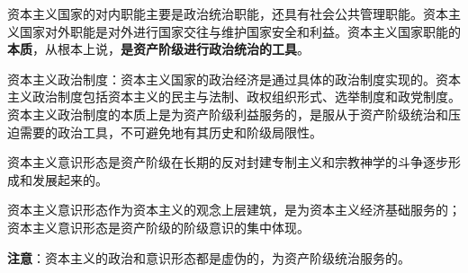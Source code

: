 资本主义国家的对内职能主要是政治统治职能，还具有社会公共管理职能。资本主义国家对外职能是对外进行国家交往与维护国家安全和利益。资本主义国家职能的\textbf{{本质}}，从根本上说，\textbf{{是资产阶级进行政治统治的工具}}。

{资本主义政治制度：资本主义国家的政治经济是通过具体的政治制度实现的。资本主义政治制度包括资本主义的民主与法制、政权组织形式、选举制度和政党制度。}{资本主义政治制度的本质上是为资产阶级利益服务的，是服从于资产阶级统治和压迫需要的政治工具，不可避免地有其历史和阶级局限性}{。}

{资本主义意识形态是资产阶级在长期的反对封建专制主义和宗教神学的斗争逐步形成和发展起来的。}

{资本主义意识形态作为资本主义的观念上层建筑，是为资本主义经济基础服务的；资本主义意识形态是资产阶级的阶级意识的集中体现}。

\textbf{{注意}}{：资本主义的政治和意识形态都是虚伪的，为资产阶级统治服务的。}
